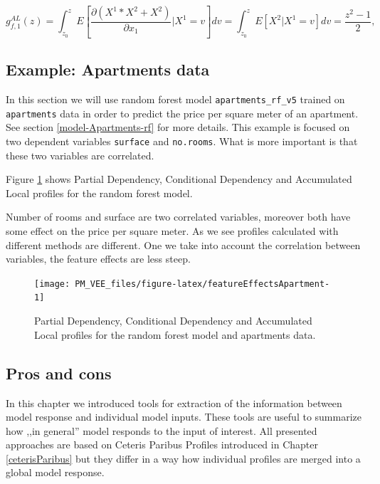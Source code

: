\documentclass[12pt,]{krantz}
\begin{document}
\[
g^{AL}_{f,1}(z) = \int_{z_0}^z E\left[\frac{\partial (X^1*X^2 + X^2)}{\partial x_1}|X^1 = v\right] dv  = \int_{z_0}^z E\left[X^2|X^1 = v\right] dv  = \frac{z^2 -1 }{2},
\]

\hypertarget{CDPExample}{%
\subsection{Example: Apartments data}\label{CDPExample}}

In this section we will use random forest model \texttt{apartments\_rf\_v5} trained on \texttt{apartments} data in order to predict the price per square meter of an apartment. See section \ref{model-Apartments-rf} for more details.
This example is focused on two dependent variables \texttt{surface} and \texttt{no.rooms}. What is more important is that these two variables are correlated.

Figure \ref{fig:featureEffectsApartment} shows Partial Dependency, Conditional Dependency and Accumulated Local profiles for the random forest model.

Number of rooms and surface are two correlated variables, moreover both have some effect on the price per square meter. As we see profiles calculated with different methods are different. One we take into account the correlation between variables, the feature effects are less steep.

\begin{figure}

{\centering \texttt{[image: PM\_VEE\_files/figure-latex/featureEffectsApartment-1]} 

}

\caption{Partial Dependency, Conditional Dependency and Accumulated Local profiles for the random forest model and apartments data.}\label{fig:featureEffectsApartment}
\end{figure}

\hypertarget{ALPProsCons}{%
\subsection{Pros and cons}\label{ALPProsCons}}

In this chapter we introduced tools for extraction of the information between model response and individual model inputs. These tools are useful to summarize how ,,in general'' model responds to the input of interest. All presented approaches are based on Ceteris Paribus Profiles introduced in Chapter \ref{ceterisParibus} but they differ in a way how individual profiles are merged into a global model response.
\end{document}
